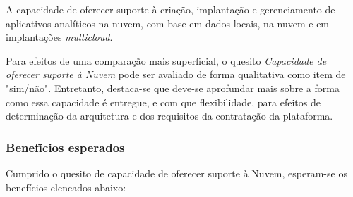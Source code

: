     \begin{definition}
        A capacidade de oferecer suporte à criação, implantação e gerenciamento de aplicativos analíticos na nuvem, com base em dados locais, na nuvem e em implantações \emph{multicloud}.
    \end{definition} 

Para efeitos de uma comparação mais superficial, o quesito \emph{Capacidade de oferecer suporte à Nuvem} pode ser avaliado de forma qualitativa como item de "sim/não". Entretanto, destaca-se que deve-se aprofundar mais sobre a forma como essa capacidade é entregue, e com que flexibilidade, para efeitos de determinação da arquitetura e dos requisitos da contratação da plataforma.

    \subsubsection*{Benefícios esperados}


    Cumprido o quesito de capacidade de oferecer suporte à Nuvem, esperam-se os benefícios elencados abaixo: 
    

